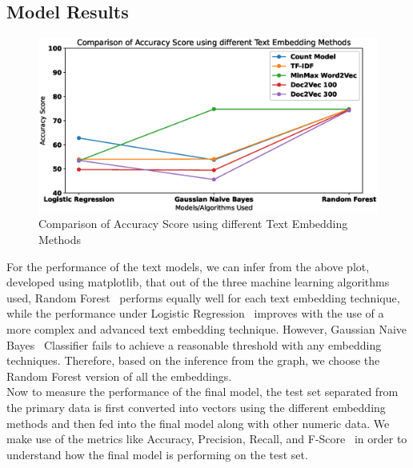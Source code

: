 \documentclass[runningheads]{llncs}
\begin{document}
\subsection{Model Results}
\begin{figure}
\includegraphics[width=\textwidth]{AccScoreTextModel.eps}
\caption{Comparison of Accuracy Score using different Text Embedding Methods} \label{fig2}
\end{figure}
For the performance of the text models, we can infer from the above plot, developed using matplotlib, that out of the three machine learning algorithms used, Random Forest~\cite{rf} performs equally well for each text embedding technique, while the performance under Logistic Regression~\cite{lr} improves with the use of a more complex and advanced text embedding technique. However, Gaussian Naive Bayes~\cite{nb} Classifier fails to achieve a reasonable threshold with any embedding techniques. Therefore, based on the inference from the graph, we choose the Random Forest version of all the embeddings.\\
Now to measure the performance of the final model, the test set separated from the primary data is first converted into vectors using the different embedding methods and then fed into the final model along with other numeric data. We make use of the metrics like Accuracy, Precision, Recall, and F-Score~\cite{metrics} in order to understand how the final model is performing on the test set.
\end{document}
